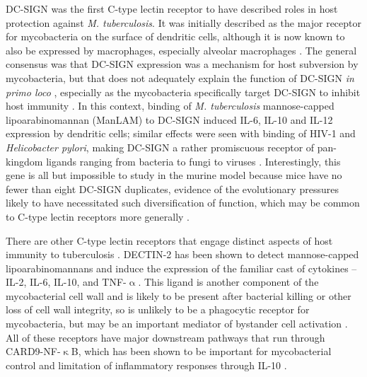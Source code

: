 DC\hyp{}SIGN was the first C\hyp{}type lectin receptor to have described roles in host protection against \textit{M. tuberculosis}. It was initially described as the major receptor for mycobacteria on the surface of dendritic cells, although it is now known to also be expressed by macrophages, especially alveolar macrophages \citep{Geijtenbeek2002, Tailleux2003, Tailleux2005}. The general consensus was that DC\hyp{}SIGN expression was a mechanism for host subversion by mycobacteria, but that does not adequately explain the function of DC\hyp{}SIGN \textit{in primo loco} \citep{vanKooyk2003}, especially as the mycobacteria specifically target DC\hyp{}SIGN to inhibit host immunity \citep{Geijtenbeek2003}. In this context, binding of \textit{M. tuberculosis} mannose\hyp{}capped lipoarabinomannan (ManLAM) \citep{Koppel2004, Maeda2003, Pitarque2005} to DC\hyp{}SIGN induced IL\hyp{}6, IL\hyp{}10 and IL\hyp{}12 expression by dendritic cells; similar effects were seen with binding of HIV\hyp{}1 and \textit{Helicobacter pylori}, making DC\hyp{}SIGN a rather promiscuous receptor of pan\hyp{}kingdom ligands ranging from bacteria to fungi to viruses \citep{Gringhuis2009, denDunnen2009}. Interestingly, this gene is all but impossible to study in the murine model because mice have no fewer than eight DC\hyp{}SIGN duplicates, evidence of the evolutionary pressures likely to have necessitated such diversification of function, which may be common to C\hyp{}type lectin receptors more generally \citep{Tanne2009, GarciaVallejo2013}.

There are other C\hyp{}type lectin receptors that engage distinct aspects of host immunity to tuberculosis \citep{Mishra2017a}. DECTIN\hyp{}2 has been shown to detect mannose\hyp{}capped lipoarabinomannans and induce the expression of the familiar cast of cytokines -- IL\hyp{}2, IL\hyp{}6, IL\hyp{}10, and TNF\hyp{}$\upalpha$. This ligand is another component of the mycobacterial cell wall and is likely to be present after bacterial killing or other loss of cell wall integrity, so is unlikely to be a phagocytic receptor for mycobacteria, but may be an important mediator of bystander cell activation \citep{Marakalala2017}. All of these receptors have major downstream pathways that run through CARD9\hyp{}NF\hyp{}$\upkappa$B, which has been shown to be important for mycobacterial control and limitation of inflammatory responses through IL\hyp{}10 \citep{Dorhoi2010}.

